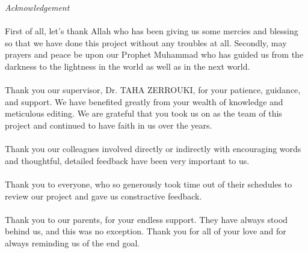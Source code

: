 %
\begin{center}
\huge{\emph{Acknowledgement}}
\end{center}

\vspace{1cm}

\paragraph{}
First of all, let’s thank Allah who has been giving us some mercies and blessing so that we have done this project without any troubles at all. Secondly, may prayers and peace be upon our Prophet Muhammad who has guided us from the darkness to the lightness in the world as well as in the next world.\\\\
\indent Thank you our supervisor, Dr. TAHA ZERROUKI, for your patience, guidance, and support. We have benefited greatly from your wealth of knowledge and meticulous editing. We are grateful that you took us on as the team of this project and continued to have faith in us over the years.\\\\
\indent Thank you our colleagues involved directly or indirectly with encouraging words and thoughtful, detailed feedback have been very important to us.\\\\
\indent Thank you to everyone, who so generously took time out of their schedules to review our project and gave us constractive feedback.\\\\
\indent Thank you to our parents, for your endless support. They have always stood behind us, and this was no exception. Thank you for all of your love and for always reminding us of the end goal.\\
